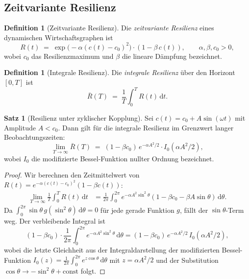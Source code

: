 \documentclass[a4paper, 12pt, twoside, openright]{report}
\theoremstyle{definition}
\newtheorem{definition}[theorem]{Definition}
\theoremstyle{definition}
\newtheorem{satz}{Satz}[chapter]
\begin{document}
\subsection{Zeitvariante Resilienz}

\begin{definition}[Zeitvariante Resilienz]
\label{def:dynResilienz}
    Die \emph{zeitvariante Resilienz} eines dynamischen Wirtschaftsgraphen ist
    \[
        R(t) \;=\; \exp\!\bigl(-\alpha(c(t)-c_0)^2\bigr)\cdot(1 - \beta\,c(t)),
        \qquad \alpha, \beta, c_0 > 0,
    \]
    wobei $c_0$ das Resilienzmaximum und $\beta$ die lineare Dämpfung bezeichnet.
\end{definition}

\begin{definition}[Integrale Resilienz]
\label{def:intResilienz}
    Die \emph{integrale Resilienz} über den Horizont $[0,T]$ ist
    \[
        \bar{R}(T) \;=\; \frac{1}{T}\int_0^T R(t)\,\mathrm{d}t.
    \]
\end{definition}

\begin{satz}[Resilienz unter zyklischer Kopplung]
\label{satz:rezyklisch}
    Sei $c(t) = c_0 + A\sin(\omega t)$ mit Amplitude $A < c_0$.
    Dann gilt für die integrale Resilienz im Grenzwert langer Beobachtungszeiten:
    \[
        \lim_{T\to\infty}\bar{R}(T)
        \;=\; (1-\beta c_0)\,e^{-\alpha A^2/2}
              \cdot I_0(\alpha A^2 / 2),
    \]
    wobei $I_0$ die modifizierte Bessel-Funktion nullter Ordnung bezeichnet.
\end{satz}

\begin{proof}
    Wir berechnen den Zeitmittelwert von $R(t) = e^{-\alpha(c(t)-c_0)^2}(1-\beta c(t))$:
    \begin{align*}
        \lim_{T\to\infty}\frac{1}{T}\int_0^T R(t)\,\mathrm{d}t
        &= \frac{1}{2\pi}\int_0^{2\pi}
           e^{-\alpha A^2\sin^2\theta}(1-\beta c_0 - \beta A\sin\theta)\,\mathrm{d}\theta.
    \end{align*}
    Da $\int_0^{2\pi}\sin\theta\,g(\sin^2\theta)\,\mathrm{d}\theta = 0$ für jede gerade
    Funktion $g$, fällt der $\sin\theta$-Term weg. Der verbleibende Integral ist
    \[
        (1-\beta c_0)\cdot\frac{1}{2\pi}\int_0^{2\pi} e^{-\alpha A^2\sin^2\theta}\,\mathrm{d}\theta
        = (1-\beta c_0)\,e^{-\alpha A^2/2}\,I_0(\alpha A^2/2),
    \]
    wobei die letzte Gleichheit aus der Integraldarstellung der modifizierten
    Bessel-Funktion $I_0(z) = \frac{1}{2\pi}\int_0^{2\pi}e^{z\cos\theta}\,\mathrm{d}\theta$
    mit $z = \alpha A^2/2$ und der Substitution $\cos\theta \to -\sin^2\theta + \mathrm{const}$
    folgt.
\end{proof}
\end{document}
